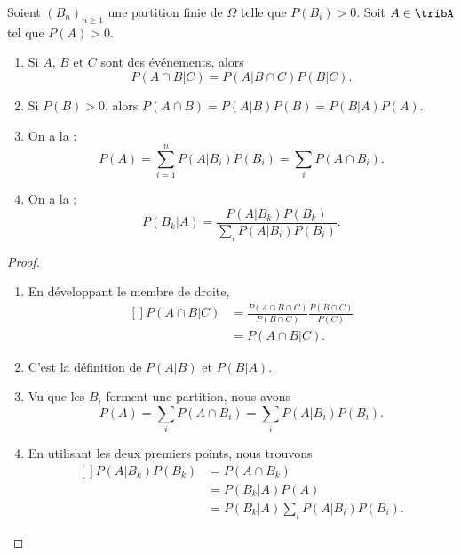 \begin{theorem}     \label{ThoBayesEtAutres}
	Soient \( (B_n)_{n\geq 1}\) une partition finie de \( \Omega\) telle que \( P(B_i)>0\). Soit \( A\in\tribA\) tel que \( P(A)>0\).
	\begin{enumerate}
		\item
		      Si \( A\), \( B\) et \( C\) sont des événements, alors
		      \begin{equation}
			      P(A\cap B|C)=P(A|B\cap C)P(B|C).
		      \end{equation}
		\item
		      Si \( P(B)>0\), alors \( P(A\cap B)=P(A|B)P(B)=P(B|A)P(A)\).
		\item On a la  :
		      \begin{equation}
			      P(A)=\sum_{i=1}^nP(A|B_i)P(B_i)=\sum_iP(A\cap B_i).
		      \end{equation}
		\item
		      On a la  :
		      \begin{equation}
			      P(B_k|A)=\frac{ P(A|B_k)P(B_k) }{ \sum_iP(A|B_i)P(B_i) }.
		      \end{equation}
	\end{enumerate}
\end{theorem}

\begin{proof}
	\begin{enumerate}
		\item
		      En développant le membre de droite,
		      \begin{equation}
			      \begin{aligned}[]
				      P(A\cap B|C) & =\frac{ P(A\cap B\cap C) }{ P(B\cap C) }\frac{ P(B\cap C) }{ P(C) } \\
				                   & =P(A\cap B|C).
			      \end{aligned}
		      \end{equation}
		\item
		      C'est la définition de \( P(A|B)\) et \( P(B|A)\).
		\item
		      Vu que les \( B_i\) forment une partition, nous avons
		      \begin{equation}
			      P(A)=\sum_iP(A\cap B_i)=\sum_iP(A|B_i)P(B_i).
		      \end{equation}
		\item
		      En utilisant les deux premiers points, nous trouvons
		      \begin{equation}
			      \begin{aligned}[]
				      P(A|B_k)P(B_k) & =P(A\cap B_k)                  \\
				                     & =P(B_k|A)P(A)                  \\
				                     & =P(B_k|A)\sum_iP(A|B_i)P(B_i).
			      \end{aligned}
		      \end{equation}
	\end{enumerate}
\end{proof}

